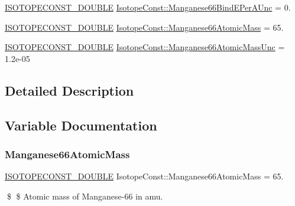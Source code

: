 \begin{DoxyCompactItemize}
\mbox{\hyperlink{group___isotope_const-_macros_ga8f45a7272ce02c0b4c65c44636ed719a}{I\+S\+O\+T\+O\+P\+E\+C\+O\+N\+S\+T\+\_\+\+D\+O\+U\+B\+LE}} \mbox{\hyperlink{group___isotope_const-_manganese-_mn66_gae72c89999b3b7cc5f19fbe800809ed0c}{Isotope\+Const\+::\+Manganese66\+Bind\+E\+Per\+A\+Unc}} = 0.
\item 
\mbox{\hyperlink{group___isotope_const-_macros_ga8f45a7272ce02c0b4c65c44636ed719a}{I\+S\+O\+T\+O\+P\+E\+C\+O\+N\+S\+T\+\_\+\+D\+O\+U\+B\+LE}} \mbox{\hyperlink{group___isotope_const-_manganese-_mn66_ga94cc077d4cdee13adf4ede14d5998ba0}{Isotope\+Const\+::\+Manganese66\+Atomic\+Mass}} = 65.
\item 
\mbox{\hyperlink{group___isotope_const-_macros_ga8f45a7272ce02c0b4c65c44636ed719a}{I\+S\+O\+T\+O\+P\+E\+C\+O\+N\+S\+T\+\_\+\+D\+O\+U\+B\+LE}} \mbox{\hyperlink{group___isotope_const-_manganese-_mn66_ga39c9618c3a92c50084d56969a3352ae3}{Isotope\+Const\+::\+Manganese66\+Atomic\+Mass\+Unc}} = 1.\+2e-\/05
\end{DoxyCompactItemize}


\subsection{Detailed Description}


\subsection{Variable Documentation}
\mbox{\label{group___isotope_const-_manganese-_mn66_ga94cc077d4cdee13adf4ede14d5998ba0}} 
\subsubsection{\texorpdfstring{Manganese66\+Atomic\+Mass}{Manganese66AtomicMass}}
{\footnotesize\ttfamily \mbox{\hyperlink{group___isotope_const-_macros_ga8f45a7272ce02c0b4c65c44636ed719a}{I\+S\+O\+T\+O\+P\+E\+C\+O\+N\+S\+T\+\_\+\+D\+O\+U\+B\+LE}} Isotope\+Const\+::\+Manganese66\+Atomic\+Mass = 65.}

\$ \$ Atomic mass of Manganese-\/66 in amu. \mbox{\label{group___isotope_const-_manganese-_mn66_ga39c9618c3a92c50084d56969a3352ae3}} 
